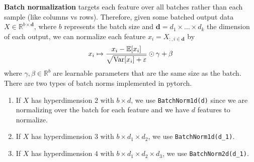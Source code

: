     \begin{definition}
      \textbf{Batch normalization} targets each feature over all batches rather than each sample (like columns vs rows). Therefore, given some batched output data $X \in \mathbb{R}^{b \times \mathbf{d}}$, where $b$ represents the batch size and $\mathbf{d} = d_1 \times \ldots \times d_k$ the dimension of each output, we can normalize each feature $x_i = X_{:,i \in \mathbf{d}}$ by 
      \begin{equation}
        x_i \mapsto \frac{x_i - \mathbb{E}[x_i]}{\sqrt{\Var[x_i] + \varepsilon}} \odot \gamma + \beta
      \end{equation}
      where $\gamma, \beta \in \mathbb{R}^b$ are learnable parameters that are the same size as the batch. There are two types of batch norms implemented in pytorch. 
      \begin{enumerate}
        \item If $X$ has hyperdimension $2$ with $b \times d$, we use \texttt{BatchNorm1d(d)} since we are normalizing over the batch for each feature and we have $d$ features to normalize. 
        \item If $X$ has hyperdimension $3$ with $b \times d_1 \times d_2$, we use \texttt{BatchNorm1d(d\_1)}. 
        \item If $X$ has hyperdimension $4$ with $b \times d_1 \times d_2 \times d_3$, we use \texttt{BatchNorm2d(d\_1)}. 
      \end{enumerate}
    \end{definition}

